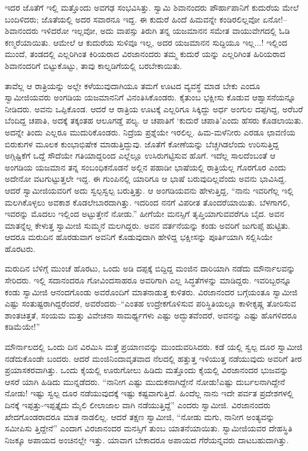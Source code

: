 ಇದರ ಜೊತೆಗೆ ಇಲ್ಲಿ ಮತ್ತೊಂದು ಅವಗಢ ಸಂಭವಿಸಿತ್ತು. ಸ್ವಾಮಿ ಶಿವಾನಂದರು ಪೌರ್ಹಾಪಾನಿಗೆ ಕುದುರೆಯ ಮೇಲೆ ಬಂದಿಳಿದರು; ಜೊತೆಯಲ್ಲಿ ಅದರ ಸವಾರನೂ ಇದ್ದ. ಈ ಕುದುರೆ ಹಿಂದೆ ಹಿಮವನ್ನೇ ಕಂಡಿರಲಿಲ್ಲವೋ ಏನೋ!–ಶಿವಾನಂದರು ಇಳಿದರೋ ಇಲ್ಲವೋ, ಅದು ವಾಪಸ್ಸು ತಿರುಗಿ ತನ್ನ ಯಜಮಾನನ ಸಮೇತ ವಾಯುವೇಗದಲ್ಲಿ ಓಡಿ ಕಣ್ಮರೆಯಾಯಿತು. ಆಮೇಲೆ ಆ ಕುದುರೆಯ ಸುಳಿವೂ ಇಲ್ಲ, ಅದರ ಯಜಮಾನನ ಸುದ್ದಿಯೂ ಇಲ್ಲ...! ಇಲ್ಲಿಂದ ಮುಂದೆ, ತಂಡದಲ್ಲಿ ಎಲ್ಲರಿಗಿಂತ ಕಿರಿಯರಾದ ವಿರಜಾನಂದರು ತಮ್ಮ ಕುದುರೆ ಯನ್ನು ಎಲ್ಲರಿಗಿಂತ ಹಿರಿಯರಾದ ಶಿವಾನಂದರಿಗೆ ಬಿಟ್ಟುಕೊಟ್ಟು, ತಾವು ಕಾಲ್ನಡಿಗೆಯಲ್ಲಿ ಬರಬೇಕಾಯಿತು.

ತಾವೆಲ್ಲ ಆ ರಾತ್ರಿಯನ್ನು ಅಲ್ಲೇ ಕಳೆಯುವುದಾಗಿಯೂ ತಮಗೆ ಊಟದ ವ್ಯವಸ್ಥೆ ಮಾಡ ಬೇಕು ಎಂದೂ ಸ್ವಾಮೀಜಿಯವರು ಅಂಗಡಿಯ ಯಜಮಾನನಿಗೆ ವಿನಂತಿಸಿಕೊಂಡರು. ಕೈತುಂಬ ಭಕ್ಷೀಸು ಕೊಡುವ ಆಶ್ವಾಸನೆಯನ್ನೂ ನೀಡಿದರು. ಅವನು ಒಪ್ಪಿಕೊಂಡ. ಆದರೆ ಆ ರಾತ್ರಿಯ ಊಟಕ್ಕೆ ಎಲ್ಲರಿಗೂ ಸಿಕ್ಕಿದ್ದು ಅರ್ಧ ಅಂಗುಲ ದಪ್ಪಗಿದ್ದ, ಅರೆಬರೆ ಬೆಂದಿದ್ದ ಚಪಾತಿ, ಅದಕ್ಕೆ ತಕ್ಕಂತಹ ಆಲೂಗಡ್ಡೆ ಪಲ್ಯ. ಆ ಚಪಾತಿಗೆ ‘ಕುದುರೆ ಚಪಾತಿ’ಎಂದು ಹೆಸರು ಕೊಡಲಾಯಿತು. ಅದನ್ನೇ ತಿಂದು ಎಲ್ಲರೂ ಮುದುರಿಕೊಂಡರು. ನಿದ್ರೆಯ ಪ್ರಶ್ನೆಯೇ ಇರಲಿಲ್ಲ. ಹಿಮ-ಮಳೆನೀರು ಎರಡೂ ಛಾವಣಿಯ ಬಿರುಕುಗಳ ಮೂಲಕ ಕುಂಭಾಭಿಷೇಕ ಮಾಡುತ್ತಿದ್ದುವು. ಜೊತೆಗೆ ಕೋಣೆಯನ್ನು ಬೆಚ್ಚಗಿಡಲೆಂದು ಉರಿಸುತ್ತಿದ್ದ ಅಗ್ಗಿಷ್ಟಿಕೆಗೆ ಒದ್ದೆ ಸೌದೆಯೇ ಗತಿಯಾದ್ದರಿಂದ ಎಲ್ಲೆಲ್ಲೂ ಉಸಿರುಗಟ್ಟಿಸುವ ಹೊಗೆ. ಇದೆಲ್ಲ ಸಾಲದೆಂಬಂತೆ ಆ ಅಂಗಡಿಯ ಯಜಮಾನ ತನ್ನ ಸಂಬಂಧಿಕನೊಡನೆ ಅಲ್ಲಿನ ಪಹಾಡೀ ಭಾಷೆಯಲ್ಲಿ ರಾತ್ರಿಯೆಲ್ಲ ಗೊರಗೊರ ಎಂದು ಅದೇನೋ ವಟಗುಟ್ಟುತ್ತಲೇ ಇದ್ದ. ಈ ಗುಂಪಿನಲ್ಲಿ ಯಾರಿಗೂ ಆ ಭಾಷೆ ಬರುವುದಿಲ್ಲವೆಂದು ಅವನು ಭಾವಿಸಿದ್ದ. ಆದರೆ ಸ್ವಾಮೀಜಿಯವರಿಗೆ ಅದು ಸ್ವಲ್ಪಸ್ವಲ್ಪ ಬರುತ್ತಿತ್ತು. ಆ ಅಂಗಡಿಯವನು ಹೇಳುತ್ತಿದ್ದ, “ನಾನು ಇವರಿಗೆಲ್ಲ ಇಲ್ಲಿ ಮಲಗಿಕೊಳ್ಳಲು ಅವಕಾಶ ಕೊಡಲೇಬಾರದಾಗಿತ್ತು. ಇದರಿಂದ ನನಗೆ ವಿಪರೀತ ತೊಂದರೆಯಾಯಿತು. ಬೆಳಗಾಗಲಿ, ಇವರನ್ನು ಮೊದಲು ಇಲ್ಲಿಂದ ಅಟ್ಟುತ್ತೇನೆ ನೋಡು.” ಹೀಗೆಯೇ ಮನಸ್ಸಿಗೆ ತೃಪ್ತಿಯಾಗುವವರೆಗೂ ಬೈದ. ಅವನ ಮಾತನ್ನೆಲ್ಲ ಕೇಳುತ್ತ ಸ್ವಾಮೀಜಿ ಸುಮ್ಮನೆ ಮಲಗಿದ್ದರು. ಅವನ ವರ್ತನೆಯನ್ನು ಕಂಡು ಅವರಿಗೆ ಜುಗುಪ್ಸೆ ಹುಟ್ಟಿತು. ಆದರೂ ಮರುದಿನ ಹೊರಡುವಾಗ ಅವನಿಗೆ ಕೊಡುವುದಾಗಿ ಹೇಳಿದ್ದ ಭಕ್ಷೀಸನ್ನು ಪೂರ್ತಿಯಾಗಿ ಸಲ್ಲಿಸಿಯೇ ಹೊರಟರು.

ಮರುದಿನ ಬೆಳಿಗ್ಗೆ ಮುಂಚೆ ಹೊರಟು, ಒಂದು ಅಡಿ ದಪ್ಪಕ್ಕೆ ಬಿದ್ದಿದ್ದ ಮಂಜಿನ ದಾರಿಯಾಗಿ ನಡೆದು ಮೌರ್ನಾಲವನ್ನು ಸೇರಿದರು. ಇಲ್ಲಿ ಸದಾನಂದರೂ ಗೋವಿಂದಸಾಹರೂ ಅವರಿಗಾಗಿ ಎಲ್ಲ ಸಿದ್ಧತೆಗಳನ್ನು ಮಾಡಿದ್ದರು. ಇವರಿಬ್ಬರನ್ನೂ ಕಂಡು ಸ್ವಾಮೀಜಿ ಆನಂದಗೊಂಡು ಅವರೊಂದಿಗೆ ಮಾತನಾಡುತ್ತ ಕುಳಿತರು. ವಿರಜಾನಂದರ ಬಗ್ಗೆಯಂತೂ ಸ್ವಾಮೀಜಿ ಎಷ್ಟು ಸಂತುಷ್ಟರಾಗಿದ್ದರೆಂದರೆ, ಅವರೆಂದರು–“ಎಂತಹ ಉದ್ರೇಕಗೊಳಿಸುವ ಪರಿಸ್ಥಿತಿಯಲ್ಲೂ ಕಾಳೀಕೃಷ್ಣ ತೋರಿಸುವ ಶಾಂತಚಿತ್ತತೆ, ಸಂಯಮ ಮತ್ತು ವಿವೇಚನಾ ಸಾಮರ್ಥ್ಯಗಳು ಎಷ್ಟು ಅದ್ಭುತವೆಂದರೆ, ಅವನನ್ನು ಎಷ್ಟು ಹೊಗಳಿದರೂ ಕಡಿಮೆಯೇ!”

ಮೌರ್ನಾಲದಲ್ಲಿ ಒಂದು ದಿನ ವಿರಮಿಸಿ ಮತ್ತೆ ಪ್ರಯಾಣವನ್ನು ಮುಂದುವರಿಸಿದರು. ಕಡೆ ಯಲ್ಲಿ ಸ್ವಲ್ಪ ದೂರ ಸ್ವಾಮೀಜಿ ನಡೆದುಕೊಂಡೇ ಬಂದರು. ಆದರೆ ಮಂಜಿನಿಂದಾವೃತವಾದ ನೆಲದಲ್ಲಿ ಹತ್ತುತ್ತ ಇಳಿಯುತ್ತ ನಡೆಯುವುದು ಅವರಿಗೆ ತೀರ ಪ್ರಯಾಸಕರವಾಗಿತ್ತು. ಒಂದು ಕೈಯಲ್ಲಿ ಊರುಗೋಲು ಹಿಡಿದು ಮತ್ತೊಂದು ಕೈಯಲ್ಲಿ ವಿರಜಾನಂದರ ಭುಜವನ್ನು ಆಸರೆ ಯಾಗಿ ಹಿಡಿದು ಮುನ್ನಡೆದರು. “ನಾನೀಗ ಎಷ್ಟು ಮುದುಕನಾಗಿದ್ದೇನೆ ನೋಡು!ಎಷ್ಟು ದುರ್ಬಲನಾಗಿದ್ದೇನೆ ನೋಡು! ಇಷ್ಟು ಸ್ವಲ್ಪ ದೂರ ನಡೆಯುವುದಕ್ಕೆ ಇಷ್ಟು ಕಷ್ಟವಾಗುತ್ತಿದೆ. ಹಿಂದೆಲ್ಲ ನಾನು ಇದೇ ಪರ್ವತ ಪ್ರದೇಶಗಳಲ್ಲಿ ದಿನಕ್ಕೆ ಇಪ್ಪತ್ತು-ಇಪ್ಪತ್ತೈದು ಮೈಲಿ ಲೀಲಾಜಾಲ ವಾಗಿ ನಡೆಯುತ್ತಿದ್ದೆ” ಎಂದರು ಸ್ವಾಮೀಜಿ. ವಿರಜಾನಂದರು ಖೇದಗೊಂಡರಾದರೂ ಮಾತ ನಾಡಲಿಲ್ಲ. ಆದರೆ ತಕ್ಷಣ ಸ್ವಾಮೀಜಿ, “ನೋಡು ಮಗು, ನಾನೀಗ ಅಂತ್ಯವನ್ನು ಸಮೀಪಿಸು ತ್ತಿದ್ದೇನೆ” ಎಂದಾಗ ವಿರಜಾನಂದರ ಮನಸ್ಸಿಗೆ ತುಂಬ ಯಾತನೆಯಾಯಿತು. ಸ್ವಾಮೀಜಿಯವರ ದೇಹಸ್ಥಿತಿ ನಿಜಕ್ಕೂ ಅಪಾಯದ ಅಂಚಿನಲ್ಲೇ ಇತ್ತು. ಯಾವಾಗ ಬೇಕಾದರೂ ಅಪಾಯದ ಗೆರೆಯನ್ನವರು ದಾಟಬಹುದಾಗಿತ್ತು.

